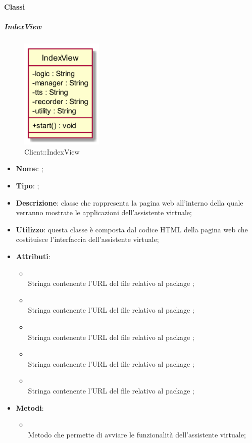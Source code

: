 \paragraph{Classi}
\hypertarget{IndexView_label}{\subparagraph{IndexView}}
\begin{figure}[h]
	\centering
	\includegraphics[width=0.35\textwidth,height=\textheight,keepaspectratio]{images/ClassIndexView.png}
	\caption{Client::IndexView}
\end{figure}
\begin{itemize}
	\item \textbf{Nome}: ;
	\item \textbf{Tipo}: ;
	\item \textbf{Descrizione}: classe che rappresenta la pagina web all'interno della quale verranno mostrate le applicazioni dell'assistente virtuale;
	\item \textbf{Utilizzo}: questa classe è composta dal codice HTML della pagina web che costituisce l'interfaccia dell'assistente virtuale;
	\item \textbf{Attributi}:
	\begin{itemize}
		\item[]  \\
		Stringa contenente l'URL del file relativo al package ;
		\item[]  \\
		Stringa contenente l'URL del file relativo al package ;
		\item[]  \\
		Stringa contenente l'URL del file relativo al package ;
		\item[]  \\
		Stringa contenente l'URL del file relativo al package ;
		\item[]  \\
		Stringa contenente l'URL del file relativo al package ;
	\end{itemize}
	\item \textbf{Metodi}:
	\begin{itemize}
		\item[]  \\		Metodo che permette di avviare le funzionalità dell'assistente virtuale;\\
	\end{itemize}
\end{itemize}
\FloatBarrier
\newpage
